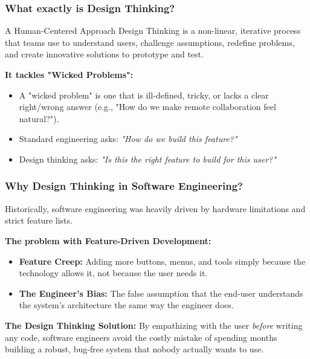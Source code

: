 \documentclass[xcolor=table]{beamer}
\begin{document}
\begin{frame}
    \frametitle{What exactly is Design Thinking?}
    \begin{block}{A Human-Centered Approach}
        Design Thinking is a non-linear, iterative process that teams use to understand users, challenge assumptions, redefine problems, and create innovative solutions to prototype and test.
    \end{block}
    
    \vspace{0.3cm}
    \textbf{It tackles "Wicked Problems":}
    \begin{itemize}
        \item A "wicked problem" is one that is ill-defined, tricky, or lacks a clear right/wrong answer (e.g., "How do we make remote collaboration feel natural?").
        \item Standard engineering asks: \textit{"How do we build this feature?"}
        \item Design thinking asks: \textit{"Is this the right feature to build for this user?"}
    \end{itemize}
\end{frame}

\begin{frame}
    \frametitle{Why Design Thinking in Software Engineering?}
    Historically, software engineering was heavily driven by hardware limitations and strict feature lists. 
    
    \vspace{0.3cm}
    \textbf{The problem with Feature-Driven Development:}
    \begin{itemize}
        \item \textbf{Feature Creep:} Adding more buttons, menus, and tools simply because the technology allows it, not because the user needs it.
        \item \textbf{The Engineer's Bias:} The false assumption that the end-user understands the system's architecture the same way the engineer does.
    \end{itemize}
    
    \vspace{0.3cm}
    \textbf{The Design Thinking Solution:}
    By empathizing with the user \textit{before} writing any code, software engineers avoid the costly mistake of spending months building a robust, bug-free system that nobody actually wants to use.
\end{frame}
\end{document}
